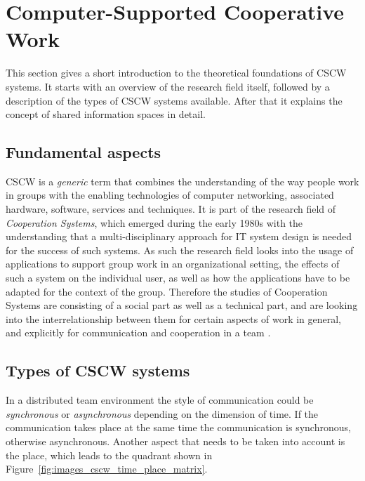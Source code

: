 
\section{Computer-Supported Cooperative Work}
\label{sec:cscw}

This section gives a short introduction to the theoretical foundations of \gls{CSCW} systems. It starts with an overview of the research field itself, followed by a description of the types of \gls{CSCW} systems available. After that it explains the concept of shared information spaces in detail.

\subsection{Fundamental aspects}
\label{sec:cscw_definition}

\gls{CSCW} is a \emph{generic} term that combines the understanding of the way people work in groups with the enabling technologies of computer networking, associated hardware, software, services and techniques. It is part of the research field of \emph{Cooperation Systems}, which emerged during the early 1980s with the understanding that a multi-disciplinary approach for \gls{IT} system design is needed for the success of such systems. As such the research field looks into the usage of applications to support group work in an organizational setting, the effects of such a system on the individual user, as well as how the applications have to be adapted for the context of the group. Therefore the studies of Cooperation Systems are consisting of a social part as well as a technical part, and are looking into the interrelationship between them for certain aspects of work in general, and explicitly for communication and cooperation in a team \citep{Grudin1994}.


\subsection{Types of \gls{CSCW} systems}
\label{sec:cscw_types}

In a distributed team environment the style of communication could be \emph{synchronous} or \emph{asynchronous} depending on the dimension of time. If the communication takes place at the same time the communication is synchronous, otherwise asynchronous. Another aspect that needs to be taken into account is the place, which leads to the quadrant shown in Figure~\ref{fig:images_cscw_time_place_matrix}. \@

